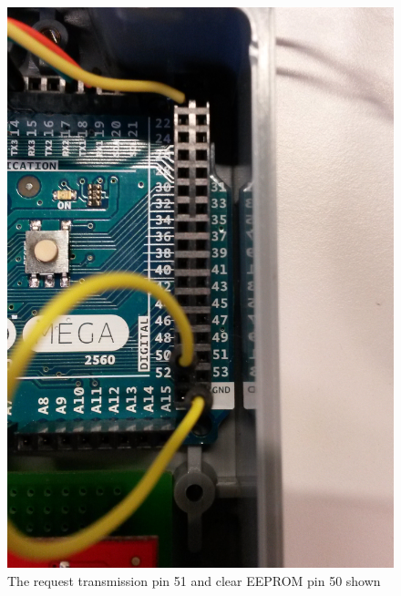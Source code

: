 \begin{figure}[H]
\centering
\includegraphics[width=0.6\linewidth]{graphics/userPins.jpg}
\caption{The request transmission pin 51 and clear EEPROM pin 50 shown\label{fig:userPins}}
\end{figure}









